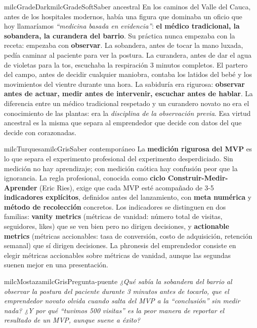 \documentclass[11pt,letterpaper]{article}
\begin{document}
\begin{softbox}{milcGradeDark}{milcGradeSoft}{Saber ancestral}
En los caminos del Valle del Cauca, antes de los hospitales modernos, había una figura que dominaba un oficio que hoy llamaríamos \emph{``medicina basada en evidencia''}: \textbf{el médico tradicional, la sobandera, la curandera del barrio}. Su práctica nunca empezaba con la receta: empezaba con \textbf{observar}. La sobandera, antes de tocar la mano luxada, pedía caminar al paciente para ver la postura. La curandera, antes de dar el agua de violetas para la tos, escuchaba la respiración 3 minutos completos. El partero del campo, antes de decidir cualquier maniobra, contaba los latidos del bebé y los movimientos del vientre durante una hora. La sabiduría era rigurosa: \textbf{observar antes de actuar, medir antes de intervenir, escuchar antes de hablar}. La diferencia entre un médico tradicional respetado y un curandero novato no era el conocimiento de las plantas: era la \emph{disciplina de la observación previa}. Esa virtud ancestral es la misma que separa al emprendedor que decide con datos del que decide con corazonadas.
\end{softbox}

\begin{softbox}{milcTurquesa}{milcGris}{Saber contemporáneo}
La \textbf{medición rigurosa del MVP} es lo que separa el experimento profesional del experimento desperdiciado. Sin medición no hay aprendizaje; con medición caótica hay confusión peor que la ignorancia. La regla profesional, conocida como \textbf{ciclo Construir-Medir-Aprender} (Eric Ries), exige que cada MVP esté acompañado de 3-5 \textbf{indicadores explícitos}, definidos antes del lanzamiento, con \textbf{meta numérica} y \textbf{método de recolección} concretos. Los indicadores se distinguen en dos familias: \textbf{vanity metrics} (métricas de vanidad: número total de visitas, seguidores, likes) que se ven bien pero no dirigen decisiones, y \textbf{actionable metrics} (métricas accionables: tasa de conversión, costo de adquisición, retención semanal) que sí dirigen decisiones. La phronesis del emprendedor consiste en elegir métricas accionables sobre métricas de vanidad, aunque las segundas suenen mejor en una presentación.
\end{softbox}

\begin{softbox}{milcMostaza}{milcGris}{Pregunta-puente}
\textit{¿Qué sabía la sobandera del barrio al observar la postura del paciente durante 3 minutos antes de tocarlo, que el emprendedor novato olvida cuando salta del MVP a la \emph{``conclusión''} sin medir nada? ¿Y por qué \emph{``tuvimos 500 visitas''} es la peor manera de reportar el resultado de un MVP, aunque suene a éxito?}
\end{softbox}
\end{document}
